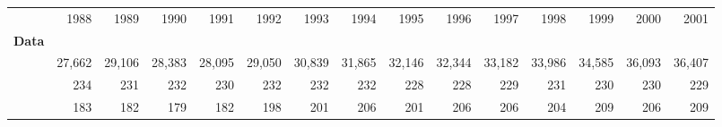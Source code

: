 \begin{tabular}{lllllllllllllll}
\cline{1-15}
\multicolumn{1}{c}{} &
  \multicolumn{1}{|r}{1988} &
  \multicolumn{1}{r}{1989} &
  \multicolumn{1}{r}{1990} &
  \multicolumn{1}{r}{1991} &
  \multicolumn{1}{r}{1992} &
  \multicolumn{1}{r}{1993} &
  \multicolumn{1}{r}{1994} &
  \multicolumn{1}{r}{1995} &
  \multicolumn{1}{r}{1996} &
  \multicolumn{1}{r}{1997} &
  \multicolumn{1}{r}{1998} &
  \multicolumn{1}{r}{1999} &
  \multicolumn{1}{r}{2000} &
  \multicolumn{1}{r}{2001} \\
\cline{1-15}
\multicolumn{1}{l}{\textbf{Data}} &
  \multicolumn{1}{|r}{} &
  \multicolumn{1}{r}{} &
  \multicolumn{1}{r}{} &
  \multicolumn{1}{r}{} &
  \multicolumn{1}{r}{} &
  \multicolumn{1}{r}{} &
  \multicolumn{1}{r}{} &
  \multicolumn{1}{r}{} &
  \multicolumn{1}{r}{} &
  \multicolumn{1}{r}{} &
  \multicolumn{1}{r}{} &
  \multicolumn{1}{r}{} &
  \multicolumn{1}{r}{} &
  \multicolumn{1}{r}{} \\
\multicolumn{1}{l}{\hspace{1em}{$\#$ obs.}} &
  \multicolumn{1}{|r}{27,662} &
  \multicolumn{1}{r}{29,106} &
  \multicolumn{1}{r}{28,383} &
  \multicolumn{1}{r}{28,095} &
  \multicolumn{1}{r}{29,050} &
  \multicolumn{1}{r}{30,839} &
  \multicolumn{1}{r}{31,865} &
  \multicolumn{1}{r}{32,146} &
  \multicolumn{1}{r}{32,344} &
  \multicolumn{1}{r}{33,182} &
  \multicolumn{1}{r}{33,986} &
  \multicolumn{1}{r}{34,585} &
  \multicolumn{1}{r}{36,093} &
  \multicolumn{1}{r}{36,407} \\
\multicolumn{1}{l}{\hspace{1em}{$\#$ sectors}} &
  \multicolumn{1}{|r}{234} &
  \multicolumn{1}{r}{231} &
  \multicolumn{1}{r}{232} &
  \multicolumn{1}{r}{230} &
  \multicolumn{1}{r}{232} &
  \multicolumn{1}{r}{232} &
  \multicolumn{1}{r}{232} &
  \multicolumn{1}{r}{228} &
  \multicolumn{1}{r}{228} &
  \multicolumn{1}{r}{229} &
  \multicolumn{1}{r}{231} &
  \multicolumn{1}{r}{230} &
  \multicolumn{1}{r}{230} &
  \multicolumn{1}{r}{229} \\
\multicolumn{1}{l}{\hspace{1em}{$\#$ origin countries}} &
  \multicolumn{1}{|r}{183} &
  \multicolumn{1}{r}{182} &
  \multicolumn{1}{r}{179} &
  \multicolumn{1}{r}{182} &
  \multicolumn{1}{r}{198} &
  \multicolumn{1}{r}{201} &
  \multicolumn{1}{r}{206} &
  \multicolumn{1}{r}{201} &
  \multicolumn{1}{r}{206} &
  \multicolumn{1}{r}{206} &
  \multicolumn{1}{r}{204} &
  \multicolumn{1}{r}{209} &
  \multicolumn{1}{r}{206} &
  \multicolumn{1}{r}{209} \\

\end{tabular}
